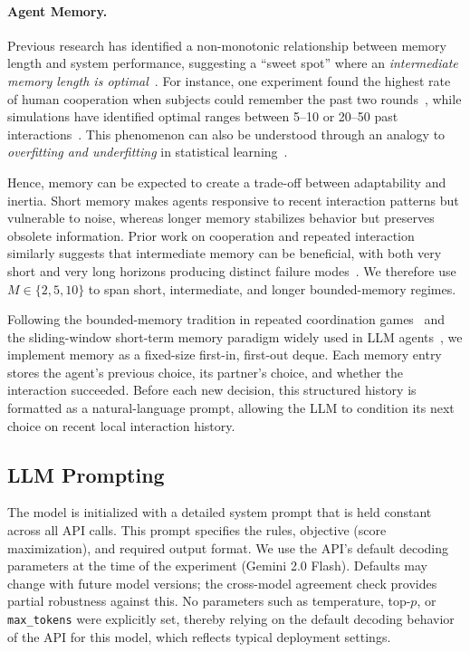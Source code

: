 \documentclass{article}
\begin{document}
\paragraph{Agent Memory.}
Previous research has identified a non-monotonic relationship between memory length and system performance, suggesting a ``sweet spot'' where an \textit{intermediate memory length is optimal}~\cite{Horvath2012, Lu2018, Ma2021}. For instance, one experiment found the highest rate of human cooperation when subjects could remember the past two rounds~\cite{Ma2021}, while simulations have identified optimal ranges between 5--10 or 20--50 past interactions~\cite{Horvath2012, Lu2018}. This phenomenon can also be understood through an analogy to \textit{overfitting and underfitting} in statistical learning~\cite{hastie2009elements}.

Hence, memory can be expected to create a trade-off between adaptability and inertia. Short memory makes agents responsive to recent interaction patterns but vulnerable to noise, whereas longer memory stabilizes behavior but preserves obsolete information. Prior work on cooperation and repeated interaction similarly suggests that intermediate memory can be beneficial, with both very short and very long horizons producing distinct failure modes~\cite{Horvath2012, Lu2018, Ma2021}. We therefore use $M \in \{2,5,10\}$ to span short, intermediate, and longer bounded-memory regimes.

Following the bounded-memory tradition in repeated coordination games~\cite{juang2008learning,marsili2001learning} and the sliding-window short-term memory paradigm widely used in LLM agents~\cite{wang2024survey,park2023generative}, we implement memory as a fixed-size first-in, first-out deque. Each memory entry stores the agent's previous choice, its partner's choice, and whether the interaction succeeded. Before each new decision, this structured history is formatted as a natural-language prompt, allowing the LLM to condition its next choice on recent local interaction history.

\subsection{LLM Prompting}
\label{sec:llm_prompting}

The model is initialized with a detailed system prompt that is held constant across all API calls. This prompt specifies the rules, objective (score maximization), and required output format. We use the API's default decoding parameters at the time of the experiment (Gemini 2.0 Flash). Defaults may change with future model versions; the cross-model agreement check provides partial robustness against this. No parameters such as temperature, top-$p$, or \texttt{max\_tokens} were explicitly set, thereby relying on the default decoding behavior of the API for this model, which reflects typical deployment settings.
\end{document}
